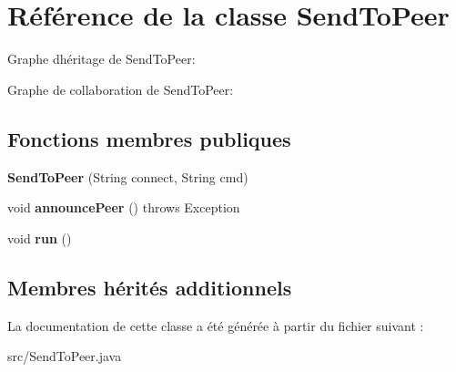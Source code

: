 \hypertarget{classSendToPeer}{}\section{Référence de la classe Send\+To\+Peer}
\label{classSendToPeer}


Graphe d\textquotesingle{}héritage de Send\+To\+Peer\+:


Graphe de collaboration de Send\+To\+Peer\+:
\subsection*{Fonctions membres publiques}
\begin{DoxyCompactItemize}
\item 
\mbox{\label{classSendToPeer_a3cd71fb803ece4920599c9c845b084a4}} 
{\bfseries Send\+To\+Peer} (String connect, String cmd)
\item 
\mbox{\label{classSendToPeer_a1259daa34e528dd2f126dc080e34abf3}} 
void {\bfseries announce\+Peer} ()  throws Exception
\item 
\mbox{\label{classSendToPeer_a55cfc5aef7b02a2aa3be5e9ab21d2bf7}} 
void {\bfseries run} ()
\end{DoxyCompactItemize}
\subsection*{Membres hérités additionnels}


La documentation de cette classe a été générée à partir du fichier suivant \+:\begin{DoxyCompactItemize}
\item 
src/Send\+To\+Peer.\+java\end{DoxyCompactItemize}

